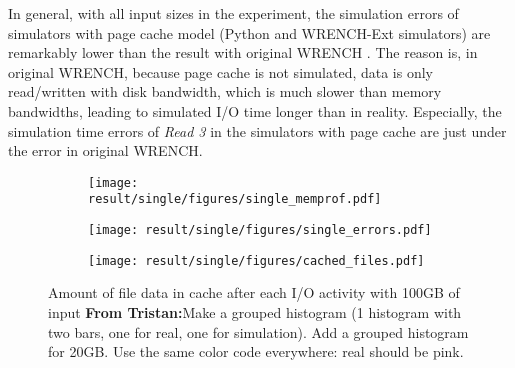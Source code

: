 \documentclass[conference]{IEEEtran}
\newcommand{\tristan}[1]{\color{orange}\textbf{From Tristan:}#1\color{black}}
\begin{document}
			In general, with all input sizes in the experiment, the simulation errors 
			of simulators with page cache model (Python and WRENCH-Ext simulators) 
			are remarkably lower than the result with original WRENCH . 
			The reason is, in original WRENCH, because page cache is not simulated, 
			data is only read/written with disk bandwidth, which is much slower 
			than memory bandwidths, leading to simulated I/O time longer than in reality.
			Especially, the simulation time errors of \textit{Read 3} in the simulators 
			with page cache are just under the error in original WRENCH. 
		
			\begin{figure*}
			\centering
			\begin{subfigure}{\linewidth}
				\centering
   				\texttt{[image: result/single/figures/single\_memprof.pdf]}
			\end{subfigure}
			\caption{Memory profiling results with different input file sizes \tristan{put the simulation/real conditions on the side, make them larger and use the same color code as below (pink for real, etc). Put the memory values on top, similar to how they are in the graphs below. }}
			\label{fig:single_memprof}	
			\begin{subfigure}{\linewidth}
				\centering
   				\texttt{[image: result/single/figures/single\_errors.pdf]}
			\end{subfigure}
			\caption{Simulation errors with different input file sizes}
			\label{fig:single_error}	
			\begin{subfigure}{\linewidth}
				\centering
   				\texttt{[image: result/single/figures/cached\_files.pdf]}
			\end{subfigure}	
			\label{fig:single_cache}
   			\caption{Amount of file data in cache after each I/O activity with 100GB of input \tristan{Make a grouped histogram (1 histogram with two bars, one for real, one for simulation). Add a grouped histogram for 20GB. Use the same color code everywhere: real should be pink.}}
			\end{figure*}			
\end{document}
